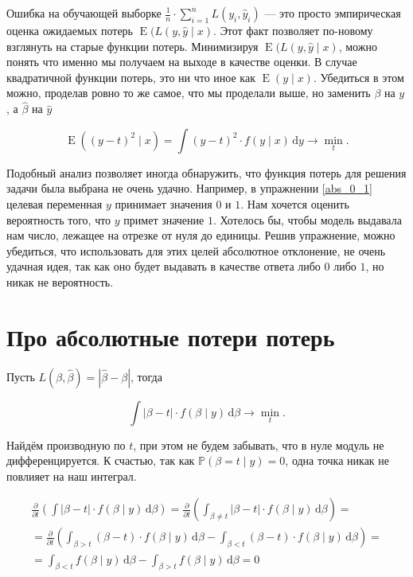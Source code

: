 \documentclass[12pt, a4paper, oneside]{extreport}
\DeclareMathOperator{\E}{\mathop{E}}
\def \hb{\hat{\beta}}
\def \b{\beta}
\def \mbb{\mathbb}
\def \PP{\mbb{P}}
\newcommand{\dx}[1]{\,\mathrm{d}#1} %
\theoremstyle{plain}              %
\theoremstyle{definition}         %
\begin{document}
Ошибка на обучающей выборке $\frac{1}{n} \cdot \sum_{i=1}^n L(y_i, \hat y_i)$ --- это просто эмпирическая оценка ожидаемых потерь $\E(L(y, \hat y \mid x)$. Этот факт позволяет по-новому взглянуть на старые функции потерь. Минимизируя $\E(L(y, \hat y \mid x)$, можно понять что именно мы получаем на выходе в качестве оценки. В случае квадратичной функции потерь, это ни что иное как $\E(y \mid x)$. Убедиться в этом можно, проделав ровно то же самое, что мы проделали выше, но заменить $\b$ на $y$, а $\hb$ на $\hat y$

\[ \E((y-t)^2 \mid x) = \int (y - t)^2 \cdot f(y \mid x) \dx{y} \to \min_{t}.\] 

Подобный анализ позволяет иногда обнаружить, что функция потерь для решения задачи была выбрана не очень удачно. Например, в упражнении \ref{abs_0_1} целевая переменная $y$ принимает значения $0$ и $1$. Нам хочется оценить вероятность того, что $y$ примет значение $1$. Хотелось бы, чтобы модель выдавала нам число, лежащее на отрезке от нуля до единицы. Решив упражнение, можно убедиться, что использовать для этих целей абсолютное отклонение, не очень удачная идея, так как оно будет выдавать в качестве ответа либо $0$ либо $1$, но никак не вероятность.   


\section{Про абсолютные потери потерь} 

Пусть $L(\beta,  \hat \beta) = |\hat \beta - \beta|$, тогда

\[ \int |\beta - t| \cdot f(\beta \mid y) \dx{\beta} \to \min_{t}. \] 

Найдём производную по $t$, при этом не будем забывать, что в нуле модуль не дифференцируется. К счастью, так как $\PP(\beta = t \mid y) = 0$, одна точка никак не повлияет на наш интеграл.

\begin{multline*}
\frac{\partial }{\partial t} \left(  \int |\beta - t| \cdot f(\beta \mid y) \dx{\beta}   \right) = \frac{\partial }{\partial t} \left(  \int_{\beta \neq t} |\beta - t| \cdot f(\beta \mid y) \dx{\beta}   \right) = \\ = \frac{\partial }{\partial t} \left( \int_{\beta > t} (\beta - t) \cdot f(\beta \mid y) \dx{\beta} - \int_{\beta < t} (\beta - t) \cdot f( \beta \mid y) \dx{\beta}  \right) = \\
= \int_{\beta < t} f(\beta \mid y) \dx{\beta} - \int_{\beta > t} f( \beta \mid y) \dx{\beta} = 0
\end{multline*}
\end{document}
